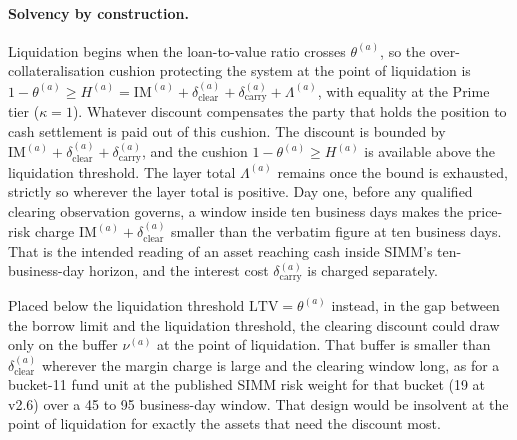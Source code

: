 \paragraph{Solvency by construction.} Liquidation begins when the loan-to-value ratio crosses $\theta^{(a)}$, so the over-collateralisation cushion protecting the system at the point of liquidation is $1-\theta^{(a)} \ge H^{(a)} = \mathrm{IM}^{(a)}+\delta_{\mathrm{clear}}^{(a)}+\delta_{\mathrm{carry}}^{(a)}+\Lambda^{(a)}$, with equality at the Prime tier ($\kappa=1$). Whatever discount compensates the party that holds the position to cash settlement is paid out of this cushion. The discount is bounded by $\mathrm{IM}^{(a)}+\delta_{\mathrm{clear}}^{(a)}+\delta_{\mathrm{carry}}^{(a)}$, and the cushion $1-\theta^{(a)}\ge H^{(a)}$ is available above the liquidation threshold. The layer total $\Lambda^{(a)}$ remains once the bound is exhausted, strictly so wherever the layer total is positive. Day one, before any qualified clearing observation governs, a window inside ten business days makes the price-risk charge $\mathrm{IM}^{(a)}+\delta_{\mathrm{clear}}^{(a)}$ smaller than the verbatim figure at ten business days. That is the intended reading of an asset reaching cash inside SIMM's ten-business-day horizon, and the interest cost $\delta_{\mathrm{carry}}^{(a)}$ is charged separately.

Placed below the liquidation threshold $\mathrm{LTV}=\theta^{(a)}$ instead, in the gap between the borrow limit and the liquidation threshold, the clearing discount could draw only on the buffer $\nu^{(a)}$ at the point of liquidation. That buffer is smaller than $\delta_{\mathrm{clear}}^{(a)}$ wherever the margin charge is large and the clearing window long, as for a bucket-11 fund unit at the published SIMM risk weight for that bucket (19 at v2.6) over a 45 to 95 business-day window. That design would be insolvent at the point of liquidation for exactly the assets that need the discount most.

